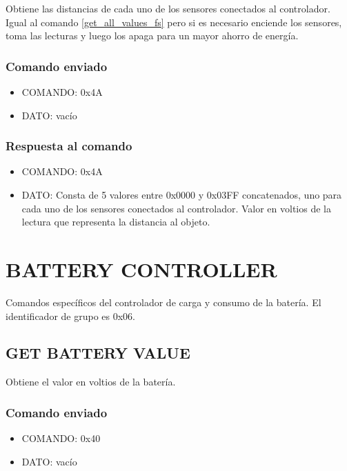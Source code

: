 \documentclass[a4paper,10pt]{article}
\begin{document}
Obtiene las distancias de cada uno de los sensores conectados al controlador.
Igual al comando \ref{get_all_values_fs} pero si es necesario enciende los sensores, toma las lecturas y luego los apaga para un mayor ahorro de energ\'ia.

\subsubsection*{Comando enviado}

\begin{itemize}
	\item{COMANDO:} 0x4A
	\item{DATO:} vac\'io
\end{itemize}

\subsubsection*{Respuesta al comando}

\begin{itemize}
	\item{COMANDO:} 0x4A
	\item{DATO:} Consta de 5 valores entre 0x0000 y 0x03FF concatenados, uno para cada uno de los sensores conectados al controlador.
	Valor en voltios de la lectura que representa la distancia al objeto.
\end{itemize}

\section{BATTERY CONTROLLER} 
\label{grupo_battery_controller}

Comandos espec\'ificos del controlador de carga y consumo de la bater\'ia.
El identificador de grupo es 0x06.

\subsection{GET BATTERY VALUE}
\label{get_battery_value}

Obtiene el valor en voltios de la bater\'ia.

\subsubsection*{Comando enviado}

\begin{itemize}
	\item{COMANDO:} 0x40
	\item{DATO:} vac\'io
\end{itemize}
\end{document}
